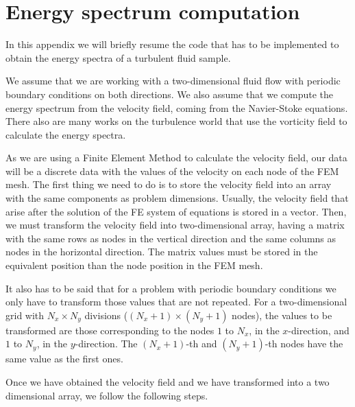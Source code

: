 
\chapter{Energy spectrum computation} %
\label{appendix-spectrum_implementation}

\label{apenA-energy_spectrum_implementation} %

In this appendix we will briefly resume the code that has to be implemented to obtain the energy spectra of a turbulent fluid sample.

We assume that we are working with a two-dimensional fluid flow with periodic boundary conditions on both directions. We also assume that we compute the energy spectrum from the velocity field, coming from the Navier-Stoke equations. There also are many works on the turbulence world that use the vorticity field to calculate the energy spectra.

As we are using a Finite Element Method to calculate the velocity field, our data will be a discrete data with the values of the velocity on each node of the FEM mesh. The first thing we need to do is to store the velocity field into an array with the same components as problem dimensions. Usually, the velocity field that arise after the solution of the FE system of equations is stored in a vector. Then, we must transform the velocity field into two-dimensional array, having a matrix with the same rows as nodes in the vertical direction and the same columns as nodes in the horizontal direction. The matrix values must be stored in the equivalent position than the node position in the FEM mesh.

It also has to be said that for a problem with periodic boundary conditions we only have to transform those values that are not repeated. For a two-dimensional grid with $N_x\times N_y$ divisions ($(N_x+1)\times(N_y+1)$ nodes), the values to be transformed are those corresponding to the nodes $1$ to $N_x$, in the $x$-direction, and $1$ to $N_y$, in the $y$-direction. The $(N_x+1)$-th and $(N_y+1)$-th nodes have the same value as the first ones.

Once we have obtained the velocity field and we have transformed into a two dimensional array, we follow the following steps.

